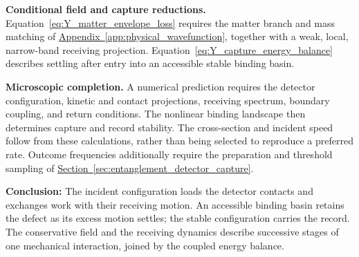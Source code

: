 \medskip
\noindent\textbf{Conditional field and capture reductions.}
Equation~\eqref{eq:Y_matter_envelope_loss} requires the matter branch and mass matching of \hyperref[app:physical_wavefunction]{Appendix~\ref*{app:physical_wavefunction}}, together with a weak, local, narrow-band receiving projection. Equation~\eqref{eq:Y_capture_energy_balance} describes settling after entry into an accessible stable binding basin.

\medskip
\noindent\textbf{Microscopic completion.}
A numerical prediction requires the detector configuration, kinetic and contact projections, receiving spectrum, boundary coupling, and return conditions. The nonlinear binding landscape then determines capture and record stability. The cross-section and incident speed follow from these calculations, rather than being selected to reproduce a preferred rate. Outcome frequencies additionally require the preparation and threshold sampling of \hyperref[sec:entanglement_detector_capture]{Section~\ref*{sec:entanglement_detector_capture}}.

\noindent\textbf{Conclusion:}
The incident configuration loads the detector contacts and exchanges work with their receiving motion. An accessible binding basin retains the defect as its excess motion settles; the stable configuration carries the record. The conservative field and the receiving dynamics describe successive stages of one mechanical interaction, joined by the coupled energy balance.
